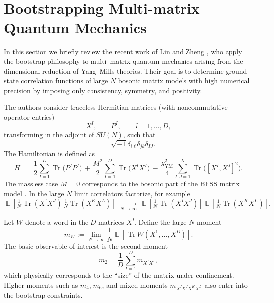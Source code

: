 \documentclass[11pt]{article}
\theoremstyle{plain}
\DeclareMathOperator{\ex}{\mathbb{E}}
\begin{document}
\section{Bootstrapping  Multi-matrix Quantum Mechanics}
In this  section we briefly review  the recent work of Lin and Zheng
\cite{LinZheng2025}, who apply the bootstrap philosophy to multi--matrix
quantum mechanics arising from the dimensional reduction of Yang--Mills
theories.  Their goal is to determine ground state correlation functions
of large $N$ bosonic matrix models with high numerical precision by
imposing only consistency, symmetry, and positivity.




The authors consider  traceless Hermitian matrices (with noncommutative operator entries)
\[
X^I, \qquad P^I, \qquad I=1,\dots, D,
\]
transforming in the adjoint of $SU(N)$, such that 
\begin{equation*}
	[(X_{I})_{ij},(P_{J})_{k\ell}] = \sqrt{-1} \delta_{i \ell}\delta_{j k} \delta_{I J}.
\end{equation*}
The Hamiltonian is defined as
\begin{equation}
H \;=\; 
\frac{1}{2} \sum_{I=1}^D \operatorname{Tr}\!\big( P^I P^I \big)
\,+\, \frac{M^2}{2} \sum_{I=1}^D \operatorname{Tr}\!\big( X^I X^I \big)
\,-\, \frac{g_{\mathrm{YM}}^2}{4}
\sum_{I,J=1}^D \operatorname{Tr}\!\Big( [X^I, X^J]^2 \Big).
\label{eq:Hamiltonian-LZ}
\end{equation}
The massless case $M=0$ corresponds to the bosonic part of the BFSS matrix 
model \cite{BankFiscShenSuss}.  In the large $N$ limit correlators factorize, for example
\[
\ex \left[ \tfrac1N \operatorname{Tr}(X^I X^J)\,
       \tfrac1N \operatorname{Tr}(X^K X^L) \right]
\;\xrightarrow[N\to\infty]{}\;
\ex \left[ \tfrac1N \operatorname{Tr}(X^I X^J) \right]
\ex \left[ \tfrac1N \operatorname{Tr}(X^K X^L) \right].
\]

\medskip

\noindent

Let $W$ denote a word in the $D$ matrices $X^I$.  Define the large $N$
moment
\[
m_W := 
\lim_{N\to\infty} 
\frac{1}{N}\ex \left[ \operatorname{Tr} W(X^1,\dots,X^D)
\right].
\]
The basic observable of interest is the second moment
\[
m_2 = \frac{1}{D}\sum_{I=1}^D m_{X^I X^I},
\]
which physically corresponds to the ``size'' of the matrix under
confinement.  Higher moments such as $m_{4}$, $m_{6}$, and mixed moments
$m_{X^I X^J X^K X^L}$ also enter into the bootstrap constraints.

\medskip
\end{document}
